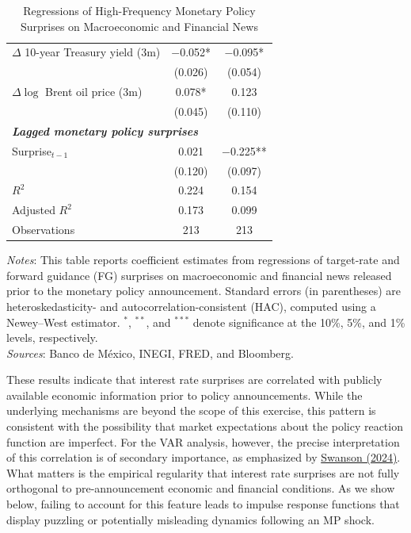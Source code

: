 \documentclass[12pt, reqno]{article}
\begin{document}
\begin{table}[t]
\begin{center}
{\begin{tabular}{lcc}
$\Delta$ 10-year Treasury yield (3m)  
& $-$0.052* 
& $-$0.095*  \\
& (0.026) 
& (0.054) \\

$\Delta \log$ Brent oil price (3m)       
& 0.078* 
& 0.123  \\
& (0.045) 
& (0.110) \\[0.4em]

\multicolumn{3}{l}{\textbf{\emph{Lagged monetary policy surprises}}} \\[0.2em]
Surprise$_{t-1}$                      
& 0.021  
& $-$0.225** \\
& (0.120)  
& (0.097) \\[0.4em]

\midrule
$R^2$              & 0.224 & 0.154 \\
Adjusted $R^2$     & 0.173 & 0.099 \\
Observations       & 213   & 213   \\
\bottomrule
\end{tabular}}
\caption{Regressions of High-Frequency Monetary Policy Surprises on Macroeconomic and Financial News}
\end{center}
\begin{footnotesize}
\textit{Notes}: This table reports coefficient estimates from regressions of target-rate and forward guidance (FG) surprises on macroeconomic and financial news released prior to the monetary policy announcement. Standard errors (in parentheses) are heteroskedasticity- and autocorrelation-consistent (HAC), computed using a Newey--West estimator. $^{*}$, $^{**}$, and $^{***}$ denote significance at the 10\%, 5\%, and 1\% levels, respectively. \\
\textit{Sources}: Banco de México, INEGI, FRED, and Bloomberg.
\end{footnotesize}
\end{table}

These results indicate that interest rate surprises are correlated with publicly available economic information prior to policy announcements. While the underlying mechanisms are beyond the scope of this exercise, this pattern is consistent with the possibility that market expectations about the policy reaction function are imperfect. For the VAR analysis, however, the precise interpretation of this correlation is of secondary importance, as emphasized by \hyperlink{Swanson (2024)}{Swanson (2024)}. What matters is the empirical regularity that interest rate surprises are not fully orthogonal to pre-announcement economic and financial conditions. As we show below, failing to account for this feature leads to impulse response functions that display puzzling or potentially misleading dynamics following an MP shock.
\end{document}
